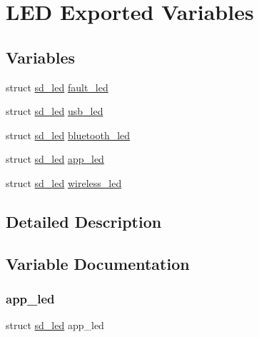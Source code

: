 \hypertarget{group___s_d___l_e_d___exported___variables}{}\section{L\+ED Exported Variables}
\label{group___s_d___l_e_d___exported___variables}
\subsection*{Variables}
\begin{DoxyCompactItemize}
\item 
struct \mbox{\hyperlink{structsd__led}{sd\+\_\+led}} \mbox{\hyperlink{group___s_d___l_e_d___exported___variables_ga282f37361758642f972e789019cf2692}{fault\+\_\+led}}
\item 
struct \mbox{\hyperlink{structsd__led}{sd\+\_\+led}} \mbox{\hyperlink{group___s_d___l_e_d___exported___variables_ga19ed39428c591574b7c023c924f70a47}{usb\+\_\+led}}
\item 
struct \mbox{\hyperlink{structsd__led}{sd\+\_\+led}} \mbox{\hyperlink{group___s_d___l_e_d___exported___variables_ga1135853c32bde3f26e5f4e59a1fc688d}{bluetooth\+\_\+led}}
\item 
struct \mbox{\hyperlink{structsd__led}{sd\+\_\+led}} \mbox{\hyperlink{group___s_d___l_e_d___exported___variables_gae551cefd341794956c9c2a06a4782ae9}{app\+\_\+led}}
\item 
struct \mbox{\hyperlink{structsd__led}{sd\+\_\+led}} \mbox{\hyperlink{group___s_d___l_e_d___exported___variables_ga3717192f0076892f0ddfd3a38348deed}{wireless\+\_\+led}}
\end{DoxyCompactItemize}


\subsection{Detailed Description}


\subsection{Variable Documentation}
\mbox{\label{group___s_d___l_e_d___exported___variables_gae551cefd341794956c9c2a06a4782ae9}} 
\subsubsection{\texorpdfstring{app\+\_\+led}{app\_led}}
{\footnotesize\ttfamily struct \mbox{\hyperlink{structsd__led}{sd\+\_\+led}} app\+\_\+led}



